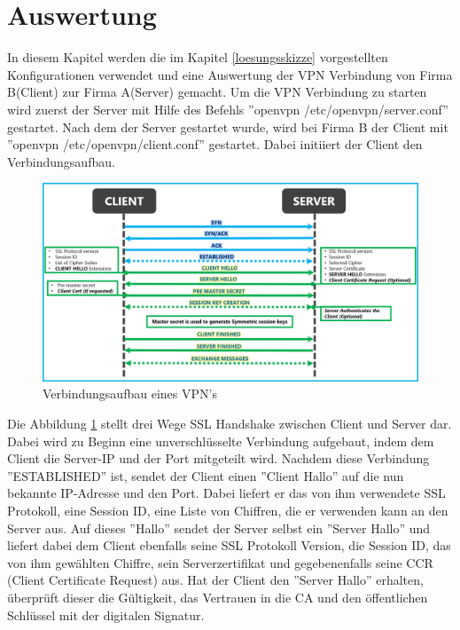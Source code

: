 \section{Auswertung}
In diesem Kapitel werden die im Kapitel \ref{loesungsskizze} vorgestellten Konfigurationen verwendet und eine Auswertung der VPN Verbindung von Firma B(Client) zur Firma A(Server) gemacht.\newline
Um die VPN Verbindung zu starten wird zuerst der Server mit Hilfe des Befehls ''openvpn /etc/openvpn/server.conf'' gestartet. Nach dem der Server gestartet wurde, wird bei Firma B der Client mit ''openvpn /etc/openvpn/client.conf'' gestartet. Dabei initiiert der Client den Verbindungsaufbau. 
\begin{figure}[h]
	\includegraphics[width=\textwidth]{pictures/vpnVerbindungsaufbau.png}
	\caption{Verbindungsaufbau eines VPN's\cite{vanRijn2018May}}
	\label{fig:SSlhand}
\end{figure}
Die Abbildung \ref{fig:SSlhand} stellt drei Wege SSL Handshake zwischen Client und Server dar. Dabei wird zu Beginn eine unverschlüsselte Verbindung aufgebaut, indem dem Client die Server-IP und der Port mitgeteilt wird. Nachdem diese Verbindung ''ESTABLISHED'' ist, sendet der Client einen ''Client Hallo'' auf die nun bekannte IP-Adresse und den Port. Dabei liefert er das von ihm verwendete SSL Protokoll, eine Session ID, eine Liste von Chiffren, die er verwenden kann an den Server aus. Auf dieses ''Hallo'' sendet der Server selbst ein ''Server Hallo'' und liefert dabei dem Client ebenfalls seine SSL Protokoll Version, die Session ID, das von ihm gewählten Chiffre, sein Serverzertifikat und gegebenenfalls seine CCR (Client Certificate Request) aus. Hat der Client den ''Server Hallo'' erhalten, überprüft dieser die Gültigkeit, das Vertrauen in die CA und den öffentlichen Schlüssel mit der digitalen Signatur. 

